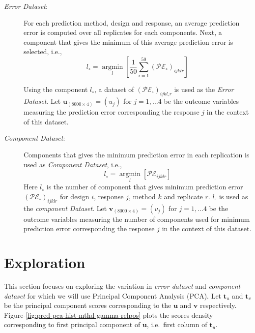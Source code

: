 \documentclass[12pt,3p,authoryear]{elsarticle}
\begin{document}
\begin{description}
\item[\emph{Error Dataset}:]
For each prediction method, design and response, an average prediction
error is computed over all replicates for each components. Next, a
component that gives the minimum of this average prediction error is
selected, i.e., \begin{equation}
  l_\circ = \operatorname*{argmin}_{l}\left[\frac{1}{50}\sum_{i=1}^{50}{\left(\mathcal{PE}_\circ\right)_{ijklr}}\right]
  \label{eq:min-pred}
  \end{equation}

Using the component \(l_\circ\), a dataset of
\(\left(\mathcal{PE}_\circ\right)_{ijkl_\circ r}\) is used as the
\emph{Error Dataset}. Let \(\mathbf{u}_{(8000 \times 4)} = (u_j)\) for
\(j = 1, \ldots 4\) be the outcome variables measuring the prediction
error corresponding the response \(j\) in the context of this dataset.
\item[\emph{Component Dataset}:]
Components that gives the minimum prediction error in each replication
is used as \emph{Component Dataset}, i.e., \begin{equation}
  l_{\circ} = \operatorname*{argmin}_{l}\left[\mathcal{PE}_{ijklr}\right]
  \label{eq:min-comp}
  \end{equation} Here \(l_\circ\) is the number of component that gives
minimum prediction error \(\left(\mathcal{PE}_\circ\right)_{ijklr}\) for
design \(i\), response \(j\), method \(k\) and replicate \(r\).
\(l_\circ\) is used as the \emph{component Dataset}. Let
\(\mathbf{v}_{(8000 \times 4)} = (v_j)\) for \(j = 1, \ldots 4\) be the
outcome variables measuring the number of components used for minimum
prediction error corresponding the response \(j\) in the context of this
dataset.
\end{description}

\hypertarget{exploration}{%
\section{Exploration}\label{exploration}}

This section focuses on exploring the variation in \emph{error dataset}
and \emph{component dataset} for which we will use Principal Component
Analysis (PCA). Let \(\mathbf{t}_u\) and \(\mathbf{t}_v\) be the
principal component scores corresponding to the \(\mathbf{u}\) and
\(\mathbf{v}\) respectively.
Figure-\ref{fig:pred-pca-hist-mthd-gamma-relpos} plots the scores
density corresponding to first principal component of \(\mathbf{u}\),
i.e.~first column of \(\mathbf{t}_u\).
\end{document}
